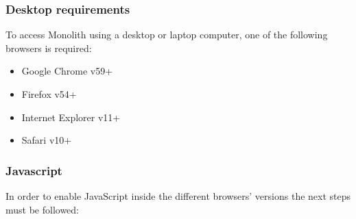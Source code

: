 \subsubsection{Desktop requirements}
To access Monolith using a desktop or laptop computer, one of the following browsers is required:
\begin{itemize}
	\item Google Chrome v59+
	\item Firefox v54+
	\item Internet Explorer v11+
	\item Safari v10+
\end{itemize}



\subsubsection{Javascript}
In order to enable JavaScript inside the different browsers' versions the next steps must be followed:
